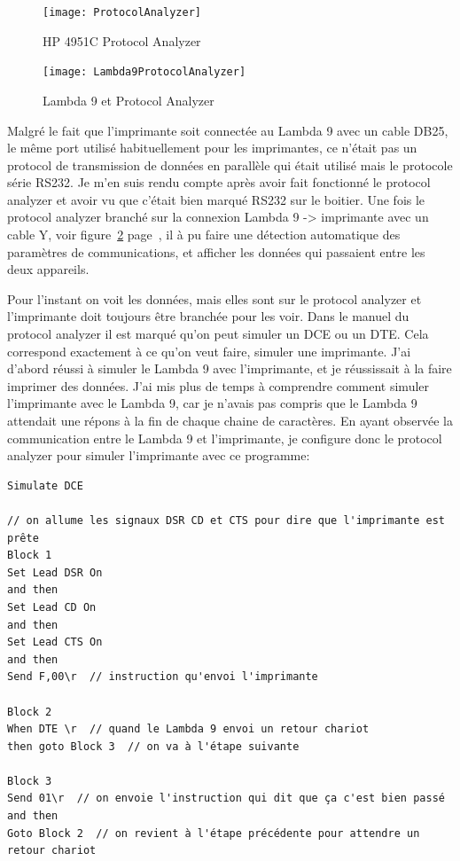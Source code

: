 \documentclass[12pt]{article}
\begin{document}
\begin{figure}[h]
	\centering
	\texttt{[image: ProtocolAnalyzer]}
	\caption{HP 4951C Protocol Analyzer}
	\label{fig:protocolAnalyzer}
\end{figure}

\begin{figure}[h]
	\centering
	\texttt{[image: Lambda9ProtocolAnalyzer]}
	\caption{Lambda 9 et Protocol Analyzer}
	\label{fig:lambda9HP}
\end{figure}


Malgré le fait que l'imprimante soit connectée au Lambda 9 avec un cable DB25, le même port utilisé habituellement pour les imprimantes, ce n'était pas un protocol de transmission de données en parallèle qui était utilisé mais le protocole série RS232.
Je m'en suis rendu compte après avoir fait fonctionné le protocol analyzer et avoir vu que c'était bien marqué RS232 sur le boitier.  
Une fois le protocol analyzer branché sur la connexion Lambda 9 -> imprimante avec un cable Y, voir figure~\ref{fig:lambda9HP} page~\pageref{fig:lambda9HP}, il à pu faire une détection automatique des paramètres de communications, et afficher les données qui passaient entre les deux appareils.

Pour l'instant on voit les données, mais elles sont sur le protocol analyzer et l'imprimante doit toujours être branchée pour les voir.
Dans le manuel du protocol analyzer il est marqué qu'on peut simuler un DCE ou un DTE.
Cela correspond exactement à ce qu'on veut faire, simuler une imprimante.
J'ai d'abord réussi à simuler le Lambda 9 avec l'imprimante, et je réussissait à la faire imprimer des données.  
J'ai mis plus de temps à comprendre comment simuler l'imprimante avec le Lambda 9, car je n'avais pas compris que le Lambda 9 attendait une répons à la fin de chaque chaine de caractères.
En ayant observée la communication entre le Lambda 9 et l'imprimante, je configure donc le protocol analyzer pour simuler l'imprimante avec ce programme:

\begin{lstlisting}  
Simulate DCE  

// on allume les signaux DSR CD et CTS pour dire que l'imprimante est prête
Block 1  
Set Lead DSR On  
and then  
Set Lead CD On  
and then  
Set Lead CTS On  
and then  
Send F,00\r  // instruction qu'envoi l'imprimante 

Block 2  
When DTE \r  // quand le Lambda 9 envoi un retour chariot
then goto Block 3  // on va à l'étape suivante

Block 3  
Send 01\r  // on envoie l'instruction qui dit que ça c'est bien passé
and then  
Goto Block 2  // on revient à l'étape précédente pour attendre un retour chariot
\end{lstlisting}  
\end{document}
